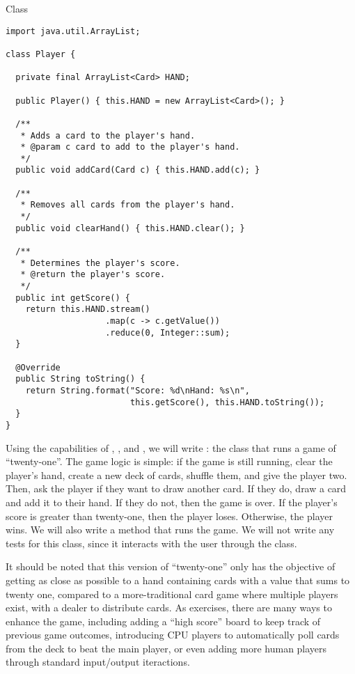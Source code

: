 \begin{cl}[]{ Class}
\begin{lstlisting}[language=MyJava]
import java.util.ArrayList;

class Player {

  private final ArrayList<Card> HAND;

  public Player() { this.HAND = new ArrayList<Card>(); }

  /**
   * Adds a card to the player's hand.
   * @param c card to add to the player's hand.
   */
  public void addCard(Card c) { this.HAND.add(c); }

  /**
   * Removes all cards from the player's hand.
   */
  public void clearHand() { this.HAND.clear(); }

  /**
   * Determines the player's score.
   * @return the player's score.
   */
  public int getScore() {
    return this.HAND.stream()
                    .map(c -> c.getValue())
                    .reduce(0, Integer::sum);
  }

  @Override
  public String toString() {
    return String.format("Score: %d\nHand: %s\n", 
                         this.getScore(), this.HAND.toString());
  }
}
\end{lstlisting}
\end{cl}

Using the capabilities of , , and , we will write : the class that runs a game of ``twenty-one''. The game logic is simple: if the game is still running, clear the player's hand, create a new deck of cards, shuffle them, and give the player two. Then, ask the player if they want to draw another card. If they do, draw a card and add it to their hand. If they do not, then the game is over. If the player's score is greater than twenty-one, then the player loses. Otherwise, the player wins. We will also write a  method that runs the game. We will not write any tests for this class, since it interacts with the user through the  class.

It should be noted that this version of ``twenty-one'' only has the objective of getting as close as possible to a hand containing cards with a value that sums to twenty one, compared to a more-traditional card game where multiple players exist, with a dealer to distribute cards. As exercises, there are many ways to enhance the game, including adding a ``high score'' board to keep track of previous game outcomes, introducing CPU players to automatically poll cards from the deck to beat the main player, or even adding more human players through standard input/output iteractions. 

